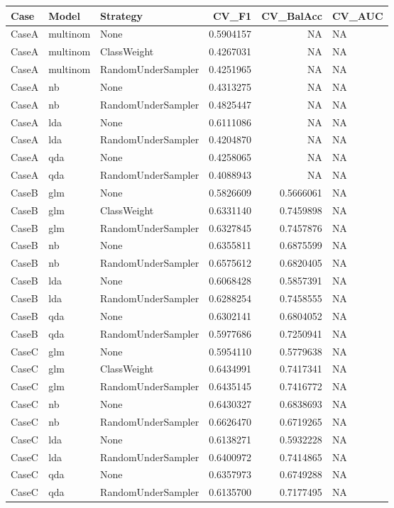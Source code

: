 
\begin{tabular}{lllrrl}
\toprule
Case & Model & Strategy & CV\_F1 & CV\_BalAcc & CV\_AUC\\
\midrule
CaseA & multinom & None & 0.5904157 & NA & NA\\
CaseA & multinom & ClassWeight & 0.4267031 & NA & NA\\
CaseA & multinom & RandomUnderSampler & 0.4251965 & NA & NA\\
CaseA & nb & None & 0.4313275 & NA & NA\\
CaseA & nb & RandomUnderSampler & 0.4825447 & NA & NA\\
\addlinespace
CaseA & lda & None & 0.6111086 & NA & NA\\
CaseA & lda & RandomUnderSampler & 0.4204870 & NA & NA\\
CaseA & qda & None & 0.4258065 & NA & NA\\
CaseA & qda & RandomUnderSampler & 0.4088943 & NA & NA\\
CaseB & glm & None & 0.5826609 & 0.5666061 & NA\\
\addlinespace
CaseB & glm & ClassWeight & 0.6331140 & 0.7459898 & NA\\
CaseB & glm & RandomUnderSampler & 0.6327845 & 0.7457876 & NA\\
CaseB & nb & None & 0.6355811 & 0.6875599 & NA\\
CaseB & nb & RandomUnderSampler & 0.6575612 & 0.6820405 & NA\\
CaseB & lda & None & 0.6068428 & 0.5857391 & NA\\
\addlinespace
CaseB & lda & RandomUnderSampler & 0.6288254 & 0.7458555 & NA\\
CaseB & qda & None & 0.6302141 & 0.6804052 & NA\\
CaseB & qda & RandomUnderSampler & 0.5977686 & 0.7250941 & NA\\
CaseC & glm & None & 0.5954110 & 0.5779638 & NA\\
CaseC & glm & ClassWeight & 0.6434991 & 0.7417341 & NA\\
\addlinespace
CaseC & glm & RandomUnderSampler & 0.6435145 & 0.7416772 & NA\\
CaseC & nb & None & 0.6430327 & 0.6838693 & NA\\
CaseC & nb & RandomUnderSampler & 0.6626470 & 0.6719265 & NA\\
CaseC & lda & None & 0.6138271 & 0.5932228 & NA\\
CaseC & lda & RandomUnderSampler & 0.6400972 & 0.7414865 & NA\\
\addlinespace
CaseC & qda & None & 0.6357973 & 0.6749288 & NA\\
CaseC & qda & RandomUnderSampler & 0.6135700 & 0.7177495 & NA\\
\bottomrule
\end{tabular}
